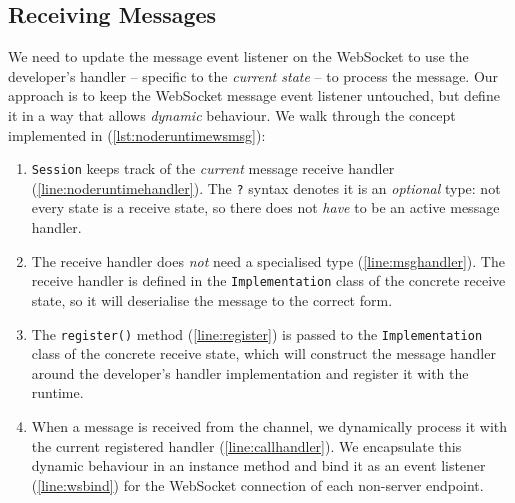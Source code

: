 \subsection{Receiving Messages}
\label{subsection:noderuntimereceive}

We need to update the message event listener on the WebSocket
to use the developer's handler -- 
specific to the \textit{current state} -- 
to process the message.
Our approach is to keep the WebSocket message event listener
untouched, but define it in a way that allows \textit{dynamic} behaviour.
We walk through the concept implemented in (\cref{lst:noderuntimewsmsg}):

\begin{enumerate}
\item 
\texttt{Session} keeps track of the \textit{current}
message receive handler (\cref{line:noderuntimehandler}).
The \texttt{?} syntax denotes it is an \textit{optional}
type: not every state is a receive state, so there does not \textit{have} to
be an active message handler.

\item
The receive handler does \textit{not} need a specialised type
(\cref{line:msghandler}). The receive handler is defined in
the \texttt{Implementation} class of the concrete receive state,
so it will deserialise the message to the correct form.

\item
The \texttt{register()} method (\cref{line:register})
is passed to the \texttt{Implementation} class of the concrete
receive state, which will construct the message handler
around the developer's handler implementation and register it
with the runtime.

\item
When a message is received from the channel,
we dynamically process it with 
the current registered handler (\cref{line:callhandler}).
We encapsulate this dynamic behaviour in an instance method
and bind it as an event listener (\cref{line:wsbind})
for the WebSocket connection
of each non-server endpoint.
\end{enumerate}


